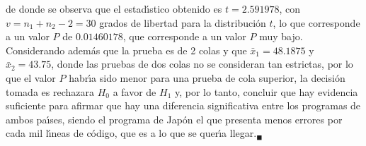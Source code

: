 \begin{solucion}
 de donde se observa que el estad\'{\i}stico obtenido es $t = 2.591978$,
 con $v = n_1 + n_2 - 2 = 30$ grados de libertad para la distribuci\'on
 $t$, lo que corresponde a un valor $P$ de $0.01460178$,
 que corresponde a un valor $P$ muy bajo.
 Considerando adem\'as que la prueba es de 2 colas
 y que $\bar{x}_1 = 48.1875$ y $\bar{x}_2 = 43.75$,
 donde las pruebas de dos colas no se consideran tan estrictas,
 por lo que el valor $P$ habr\'{\i}a sido menor para una prueba
 de cola superior, la decisi\'on tomada es rechazara $H_0$
 a favor de $H_1$ y, por lo tanto, concluir que hay evidencia suficiente
 para afirmar que hay una diferencia significativa entre los programas
 de ambos pa\'{\i}ses, siendo el programa de Jap\'on
 el que presenta menos errores por cada mil l\'{\i}neas de c\'odigo,
 que es a lo que se quer\'{\i}a llegar.${}_{\blacksquare}$
\end{solucion}

